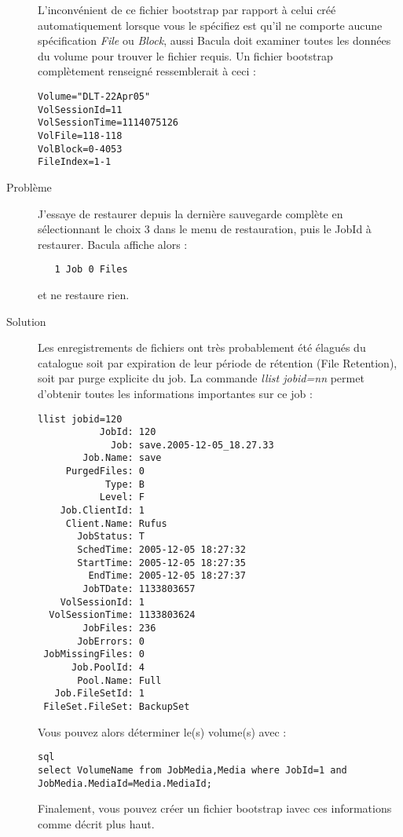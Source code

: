 \begin{description}
  L'inconv\'enient de ce fichier bootstrap par rapport \`a celui cr\'e\'e automatiquement 
  lorsque vous le sp\'ecifiez est qu'il ne comporte aucune sp\'ecification {\it File} 
  ou {\it Block}, aussi Bacula doit examiner toutes les donn\'ees du volume pour 
  trouver le fichier requis. Un fichier bootstrap compl\`etement renseign\'e ressemblerait 
  \`a ceci :

\footnotesize
\begin{verbatim}
Volume="DLT-22Apr05"
VolSessionId=11
VolSessionTime=1114075126
VolFile=118-118
VolBlock=0-4053
FileIndex=1-1
\end{verbatim}
\normalsize

\item [Probl\`eme]
   J'essaye de restaurer depuis la derni\`ere sauvegarde compl\`ete en 
   s\'electionnant le choix 3 dans le menu de restauration, puis le 
   JobId \`a restaurer. Bacula affiche alors :

\footnotesize
\begin{verbatim}
   1 Job 0 Files
\end{verbatim}
\normalsize
   et ne restaure rien.
\item[Solution]
   Les enregistrements de fichiers ont tr\`es probablement \'et\'e \'elagu\'es du catalogue 
   soit par expiration de leur p\'eriode de r\'etention (File Retention), soit par purge 
   explicite du job. La commande {\it llist jobid=nn} permet d'obtenir toutes les 
   informations importantes sur ce job :
\footnotesize
\begin{verbatim}
llist jobid=120
           JobId: 120
             Job: save.2005-12-05_18.27.33
        Job.Name: save
     PurgedFiles: 0
            Type: B
           Level: F
    Job.ClientId: 1
     Client.Name: Rufus
       JobStatus: T
       SchedTime: 2005-12-05 18:27:32
       StartTime: 2005-12-05 18:27:35
         EndTime: 2005-12-05 18:27:37
        JobTDate: 1133803657
    VolSessionId: 1
  VolSessionTime: 1133803624
        JobFiles: 236
       JobErrors: 0
 JobMissingFiles: 0
      Job.PoolId: 4
       Pool.Name: Full
   Job.FileSetId: 1
 FileSet.FileSet: BackupSet
\end{verbatim}
\normalsize
   Vous pouvez alors d\'eterminer le(s) volume(s) avec : 
\footnotesize
\begin{verbatim}
sql
select VolumeName from JobMedia,Media where JobId=1 and JobMedia.MediaId=Media.MediaId;
\end{verbatim}
\normalsize
   Finalement, vous pouvez cr\'eer un fichier bootstrap iavec ces informations 
   comme d\'ecrit plus haut.


\end{description}
